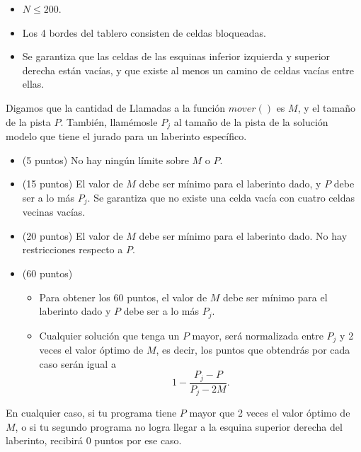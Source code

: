 \documentclass[12pt]{scrartcl}
\begin{document}
        \begin{itemize}
            \item $N \le 200$.
            \item Los 4 bordes del tablero consisten de celdas bloqueadas.
            \item Se garantiza que las celdas de las esquinas inferior izquierda y superior derecha están vacías, y que existe al menos un camino de celdas vacías entre ellas.
        \end{itemize}
        

    Digamos que la cantidad de Llamadas a la función $mover()$ es $M$, y el tamaño de la pista $P$.
    También, llamémosle $P_j$ al tamaño de la pista de la solución modelo que tiene el jurado para un laberinto específico. 

    \begin{itemize}
        \item (5 puntos) No hay ningún límite sobre $M$ o $P$.
        \item (15 puntos) El valor de $M$ debe ser mínimo para el laberinto dado, y $P$ debe ser a lo más $P_j$. Se garantiza que no existe una celda vacía con cuatro celdas vecinas vacías.
        \item (20 puntos) El valor de $M$ debe ser mínimo para el laberinto dado. No hay restricciones respecto a $P$.
        \item (60 puntos) 
        \begin{itemize}
            \item Para obtener los 60 puntos, el valor de $M$ debe ser mínimo para el laberinto dado y $P$ debe ser a lo más  $P_j$.
            \item Cualquier solución que tenga un $P$ mayor, será normalizada entre $P_j$ y 2 veces el valor óptimo de $M$, es decir, los puntos que obtendrás por cada caso serán igual a
            \[1 - \frac{P_j - P}{P_j - 2M}.\]
        \end{itemize}
    \end{itemize}
    En cualquier caso, si tu programa tiene $P$ mayor que 2 veces el valor óptimo de $M$, o si tu segundo programa no logra llegar a la esquina superior derecha del laberinto, recibirá 0 puntos por ese caso.
\end{document}
